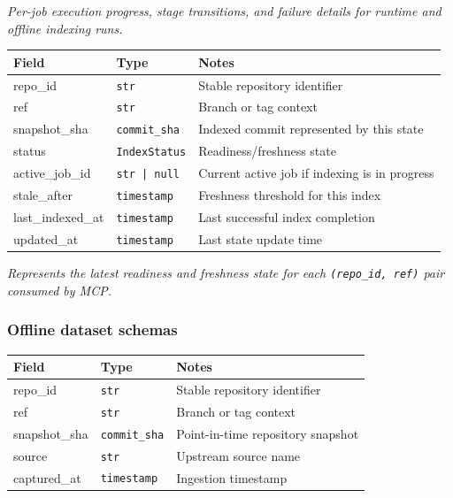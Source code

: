 \documentclass[a4paper,12pt]{article}
\begin{document}
\noindent \textit{Per-job execution progress, stage transitions, and failure details for runtime and offline indexing runs.}\\

\begin{tcolorbox}[title=IndexStateSchema]
\footnotesize
\begin{tabularx}{\linewidth}{@{} l l Y @{}}
\toprule
\textbf{Field} & \textbf{Type} & \textbf{Notes} \\
\midrule
repo\_id & \texttt{str} & Stable repository identifier \\
ref & \texttt{str} & Branch or tag context \\
snapshot\_sha & \texttt{commit\_sha} & Indexed commit represented by this state \\
status & \texttt{IndexStatus} & Readiness/freshness state \\
active\_job\_id & \texttt{str | null} & Current active job if indexing is in progress \\
stale\_after & \texttt{timestamp} & Freshness threshold for this index \\
last\_indexed\_at & \texttt{timestamp} & Last successful index completion \\
updated\_at & \texttt{timestamp} & Last state update time \\
\bottomrule
\end{tabularx}
\end{tcolorbox}

\noindent \textit{Represents the latest readiness and freshness state for each \texttt{(repo\_id, ref)} pair consumed by MCP.}

\subsubsection{Offline dataset schemas}

\begin{tcolorbox}[title=RepoSnapshotSchema]
\footnotesize
\begin{tabularx}{\linewidth}{@{} l l Y @{}}
\toprule
\textbf{Field} & \textbf{Type} & \textbf{Notes} \\
\midrule
repo\_id & \texttt{str} & Stable repository identifier \\
ref & \texttt{str} & Branch or tag context \\
snapshot\_sha & \texttt{commit\_sha} & Point-in-time repository snapshot \\
source & \texttt{str} & Upstream source name \\
captured\_at & \texttt{timestamp} & Ingestion timestamp \\
\bottomrule
\end{tabularx}
\end{tcolorbox}
\end{document}
